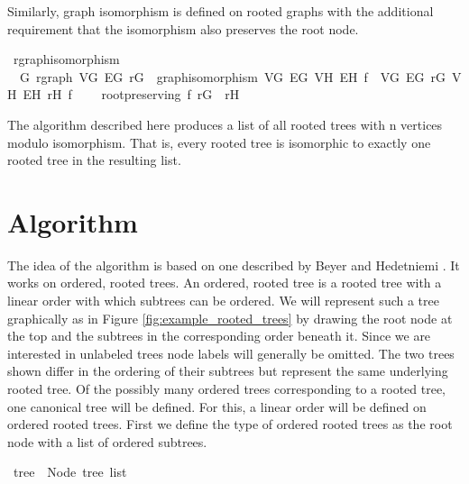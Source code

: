 Similarly, graph isomorphism is defined on rooted graphs with the additional requirement that the isomorphism also preserves the root node.

\begin{isabellebox}
    \isamarkupfalse%
    \ rgraph{\isacharunderscore}{\kern0pt}isomorphism\ {\isacharequal}{\kern0pt}\isanewline
    \ \ G{\isacharcolon}{\kern0pt}\ rgraph\ V\isactrlsub G\ E\isactrlsub G\ r\isactrlsub G\ {\isacharplus}{\kern0pt}\ graph{\isacharunderscore}{\kern0pt}isomorphism\ V\isactrlsub G\ E\isactrlsub G\ V\isactrlsub H\ E\isactrlsub H\ f\ \ V\isactrlsub G\ E\isactrlsub G\ r\isactrlsub G\ V\isactrlsub H\ E\isactrlsub H\ r\isactrlsub H\ f\ {\isacharplus}{\kern0pt}\isanewline
    \ \ \ root{\isacharunderscore}{\kern0pt}preserving{\isacharcolon}{\kern0pt}\ {\isachardoublequoteopen}f\ r\isactrlsub G\ {\isacharequal}{\kern0pt}\ r\isactrlsub H{\isachardoublequoteclose}
\end{isabellebox}

The algorithm described here produces a list of all rooted trees with n vertices modulo isomorphism.
That is, every rooted tree is isomorphic to exactly one rooted tree in the resulting list.


\section{Algorithm}

The idea of the algorithm is based on one described by Beyer and Hedetniemi \parencite{beyer}.
It works on ordered, rooted trees.
An ordered, rooted tree is a rooted tree with a linear order with which subtrees can be ordered.
We will represent such a tree graphically as in Figure \ref{fig:example_rooted_trees} by drawing the root node at the top and the subtrees in the corresponding order beneath it.
Since we are interested in unlabeled trees node labels will generally be omitted.
The two trees shown differ in the ordering of their subtrees but represent the same underlying rooted tree.
Of the possibly many ordered trees corresponding to a rooted tree, one canonical tree will be defined.
For this, a linear order will be defined on ordered rooted trees.
First we define the type of ordered rooted trees as the root node with a list of ordered subtrees.

\begin{isabellebox}
\isamarkupfalse%
\ tree\ {\isacharequal}{\kern0pt}\ Node\ {\isachardoublequoteopen}tree\ list{\isachardoublequoteclose}
\end{isabellebox}

